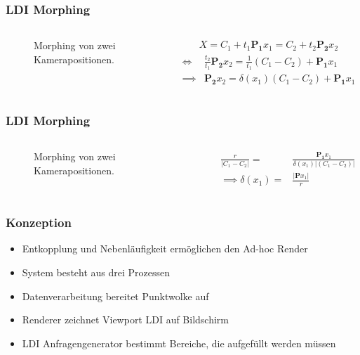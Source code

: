 \documentclass[aspectratio=169]{beamer}
\begin{document}
\begin{frame}
    \frametitle{LDI Morphing}
        \begin{columns}
            \begin{figure}
                \centering
                \resizebox{.9\linewidth}{!}{}
                \caption{Morphing von zwei Kamerapositionen.}%
                \label{fig:ldimorph}
        \end{figure}
        \begin{align}
            X = C_1 + t_1 \mathbf{P_1} x_1 %
            = C_2 + t_2 \mathbf{P_2} x_2
        \end{align}
        \begin{align}
            \iff{} & \frac{t_2}{t_1} \mathbf{P_2} x_2 %
            = \frac{1}{t_1}(C_1 - C_2) + \mathbf{P_1} x_1 \\
            \implies{} & \mathbf{P_2} x_2 
	        = \delta(x_1) (C_1 - C_2) + \mathbf{P_1} x_1
        \end{align}
    \end{columns}
\end{frame}

\begin{frame}
    \frametitle{LDI Morphing}
        \begin{columns}
            \begin{figure}
                \centering
                \resizebox{.9\linewidth}{!}{}
                \caption{Morphing von zwei Kamerapositionen.}%
                \label{fig:ldimorph}
        \end{figure}
        \begin{align}
            \frac{r}{\lvert C_1 - C_2 \rvert} = &
            \frac{\mathbf{P_1} x_1}{\delta(x_1) \lvert (C_1 - C_2) \rvert}
            \\ %
            \implies \delta(x_1) =              &
            \frac{\lvert \mathbf{P} x_1 \lvert}{r}
        \end{align}
    \end{columns}
\end{frame}

\begin{frame}
    \frametitle{Konzeption}
    \begin{itemize}
        \item Entkopplung und Nebenläufigkeit ermöglichen den Ad-hoc Render
        \item System besteht aus drei Prozessen
        \item Datenverarbeitung bereitet Punktwolke auf
        \item Renderer zeichnet Viewport LDI auf Bildschirm
        \item LDI Anfragengenerator bestimmt Bereiche, die aufgefüllt werden müssen
    \end{itemize}
\end{frame}
\end{document}
